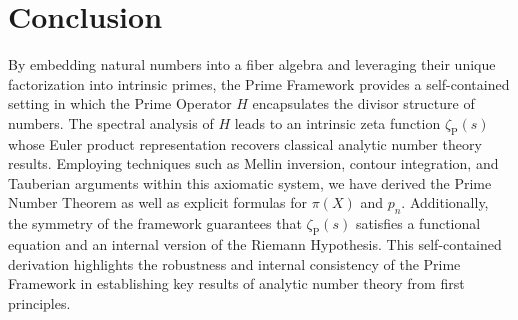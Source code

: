\documentclass{article}
\begin{document}
\section{Conclusion}
By embedding natural numbers into a fiber algebra and leveraging their unique factorization into intrinsic primes, the Prime Framework provides a self-contained setting in which the Prime Operator \(H\) encapsulates the divisor structure of numbers. The spectral analysis of \(H\) leads to an intrinsic zeta function \(\zeta_{\mathrm{P}}(s)\) whose Euler product representation recovers classical analytic number theory results. Employing techniques such as Mellin inversion, contour integration, and Tauberian arguments within this axiomatic system, we have derived the Prime Number Theorem as well as explicit formulas for \(\pi(X)\) and \(p_n\). Additionally, the symmetry of the framework guarantees that \(\zeta_{\mathrm{P}}(s)\) satisfies a functional equation and an internal version of the Riemann Hypothesis. This self-contained derivation highlights the robustness and internal consistency of the Prime Framework in establishing key results of analytic number theory from first principles.
\end{document}
